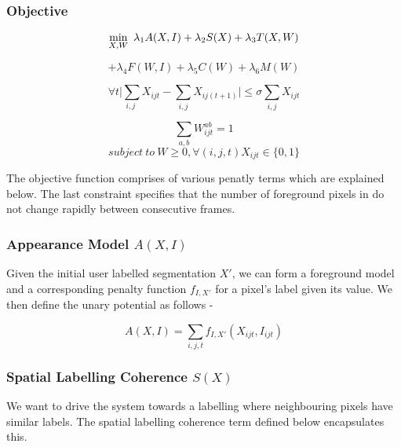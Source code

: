 \subsubsection*{Objective}

\begin{equation}
\underset{X,W}{\min}\enskip\lambda_{1}A(X,I)+\lambda_{2}S(X)+\lambda_{3}T(X,W)
\end{equation}

\[
+\lambda_{4}F(W,I) +\lambda_{5}C(W)+\lambda_{6}M(W)
\]


\begin{center}

\begin{equation}\label{eq: shrinkage}
\forall t\underset{i,j}{|\sum}X_{ijt}-\underset{i,j}{\sum}X_{ij(t+1)}|\leq\sigma\underset{i,j}{\sum}X_{ijt}
\end{equation}

$$\underset{a,b}{\sum}W_{ijt}^{ab}=1$$
$$subject~to~W\geq0,\forall(i,j,t)X_{ijt}\in\{0,1\}$$
\par\end{center}

\noindent The objective function comprises of various penatly terms
which are explained below. The last constraint specifies that the
number of foreground pixels in do not change rapidly between consecutive
frames.


\subsubsection*{Appearance Model $A(X,I)$}

Given the initial user labelled segmentation $X'$, we can form a
foreground model and a corresponding penalty function $f_{I,X'}$
for a pixel's label given its value. We then define the unary potential
as follows -

\begin{equation} \label{eq: appModel}
A(X,I)=\underset{i,j,t}{\sum}f_{I,X'}(X_{ijt},I_{ijt})
\end{equation}



\subsubsection*{Spatial Labelling Coherence $S(X)$}

We want to drive the system towards a labelling where neighbouring
pixels have similar labels. The spatial labelling coherence term defined
below encapsulates this.


